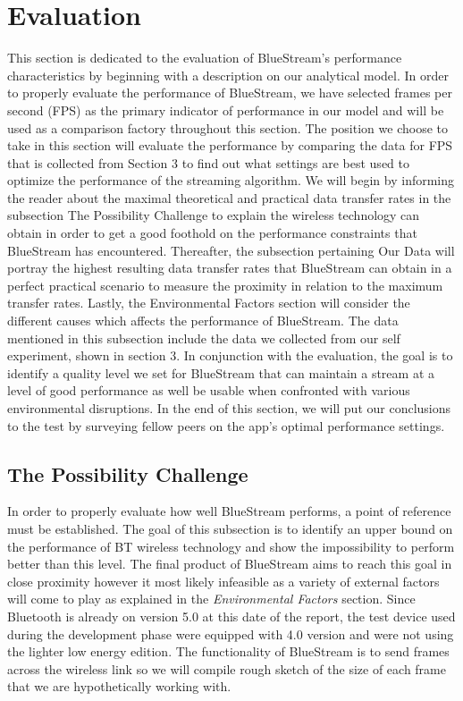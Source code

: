 \documentclass[a4paper,12pt]{article}
\begin{document}
\section{Evaluation}
This section is dedicated to the evaluation of BlueStream’s performance characteristics by beginning with a description on our analytical model. In order to properly evaluate the performance of BlueStream, we have selected frames per second (FPS) as the primary indicator of performance in our model and will be used as a comparison factory throughout this section. The position we choose to take in this section will evaluate the performance by comparing the data for FPS that is collected from Section 3 to find out what settings are best used to optimize the performance of the streaming algorithm. We will begin by informing the reader about the maximal theoretical and practical data transfer rates in the subsection The Possibility Challenge to explain the wireless technology can obtain in order to get a good foothold on the performance constraints that BlueStream has encountered. Thereafter, the subsection pertaining Our Data will portray the highest resulting data transfer rates that BlueStream can obtain in a perfect practical scenario to measure the proximity in relation to the maximum transfer rates. Lastly, the Environmental Factors section will consider the different  causes which affects the performance of BlueStream. The data mentioned in this subsection include the data we collected from our self experiment, shown in section 3. In conjunction with the evaluation, the goal is to identify a quality level we set for BlueStream that can maintain a stream at a level of good performance as well be usable when confronted with various environmental disruptions. In the end of this section, we will put our conclusions to the test by surveying fellow peers on the app’s optimal performance settings. 

\subsection{The Possibility Challenge}

In order to properly evaluate how well BlueStream performs, a point of reference must be established. The goal of this subsection is to identify an upper bound on the performance of BT wireless technology and show the impossibility to perform better than this level. The final product of BlueStream aims to reach this goal in close proximity however it most likely infeasible as a variety of external factors will come to play as explained in the \textit{Environmental Factors} section. Since Bluetooth is already on version 5.0 at this date of the report, the test device used during the development phase were equipped with 4.0 version and were not using the lighter low energy edition. The functionality of BlueStream is to send frames across the wireless link so we will compile rough sketch of the size of each frame that we are hypothetically working with.
\end{document}
